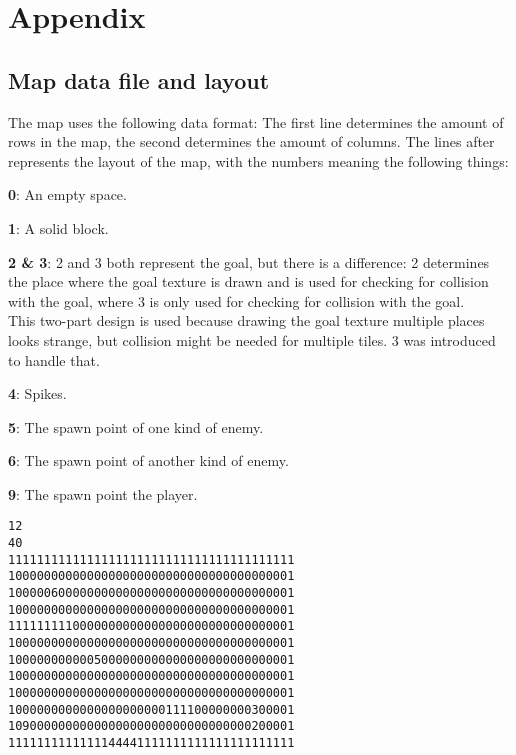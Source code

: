 \section{Appendix}
\label{06}

\subsection{Map data file and layout}
\label{06_01}

The map uses the following data format: The first line determines the amount of rows in the map, the second determines the amount of columns. The lines after represents the layout of the map, with the numbers meaning the following things:

\begin{my_itemize}

	\item \textbf{0}: An empty space.

	\item \textbf{1}: A solid block.

	\item \textbf{2 \& 3}: 2 and 3 both represent the goal, but there is a difference: 2 determines the place where the goal texture is drawn and is used for checking for collision with the goal, where 3 is only used for checking for collision with the goal. 
		\\This two-part design is used because drawing the goal texture multiple places looks strange, but collision might be needed for multiple tiles. 3 was introduced to handle that.

	\item \textbf{4}: Spikes.

	\item \textbf{5}: The spawn point of one kind of enemy.

	\item \textbf{6}: The spawn point of another kind of enemy.

	\item \textbf{9}: The spawn point the player.

\end{my_itemize}

\begin{lstlisting}
12
40
1111111111111111111111111111111111111111
1000000000000000000000000000000000000001
1000006000000000000000000000000000000001
1000000000000000000000000000000000000001
1111111110000000000000000000000000000001
1000000000000000000000000000000000000001
1000000000005000000000000000000000000001
1000000000000000000000000000000000000001
1000000000000000000000000000000000000001
1000000000000000000000111100000000300001
1090000000000000000000000000000000200001
1111111111111144441111111111111111111111
\end{lstlisting}